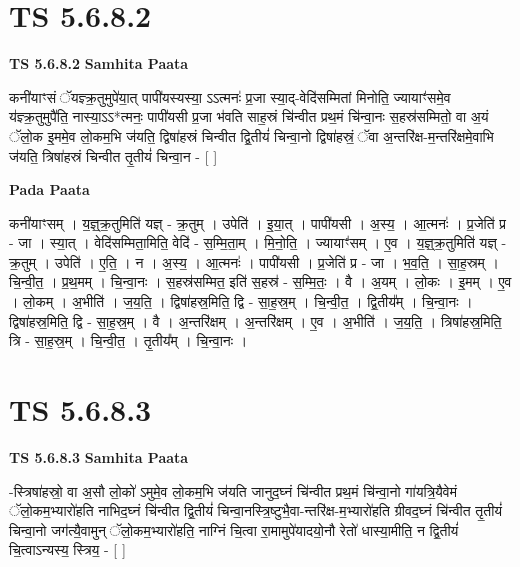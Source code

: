 \documentclass[17pt]{extarticle}
\begin{document}

\section{ TS 5.6.8.2 }

\textbf{TS 5.6.8.2 } \newline
\textbf{Samhita Paata} \newline

कनी॑याꣳसं ॅयज्ञ्क्र॒तुमुपे॑या॒त् पापी॑यस्यस्या॒ ऽऽत्मनः॑ प्र॒जा स्या॒द्-वेदि॑सम्मितां मिनोति॒ ज्यायाꣳ॑समे॒व य॑ज्ञ्क्र॒तुमुपै॑ति॒ नास्या॒ऽऽ*त्मनः॒ पापी॑यसी प्र॒जा भ॑वति साह॒स्रं चि॑न्वीत प्रथ॒मं चि॑न्वा॒नः स॒हस्र॑सम्मितो॒ वा अ॒यं ॅलो॒क इ॒ममे॒व लो॒कम॒भि ज॑यति॒ द्विषा॑हस्रं चिन्वीत द्वि॒तीयं॑ चिन्वा॒नो द्विषा॑हस्रं॒ ॅवा अ॒न्तरि॑क्ष-म॒न्तरि॑क्षमे॒वाभि ज॑यति॒ त्रिषा॑हस्रं चिन्वीत तृ॒तीयं॑ चिन्वा॒न - [  ] \newline

\textbf{Pada Paata} \newline

कनी॑याꣳसम् । य॒ज्ञ्॒क्र॒तुमिति॑ यज्ञ् - क्र॒तुम् । उपेति॑ । इ॒या॒त् । पापी॑यसी । अ॒स्य॒ । आ॒त्मनः॑ । प्र॒जेति॑ प्र - जा । स्या॒त् । वेदि॑सम्मिता॒मिति॒ वेदि॑ - स॒म्मि॒ता॒म् । मि॒नो॒ति॒ । ज्यायाꣳ॑सम् । ए॒व । य॒ज्ञ्॒क्र॒तुमिति॑ यज्ञ् - क्र॒तुम् । उपेति॑ । ए॒ति॒ । न । अ॒स्य॒ । आ॒त्मनः॑ । पापी॑यसी । प्र॒जेति॑ प्र - जा । भ॒व॒ति॒ । सा॒ह॒स्रम् । चि॒न्वी॒त॒ । प्र॒थ॒मम् । चि॒न्वा॒नः । स॒हस्र॑सम्मित॒ इति॑ स॒हस्र॑ - स॒म्मि॒तः॒ । वै । अ॒यम् । लो॒कः ।   इ॒मम् । ए॒व । लो॒कम् । अ॒भीति॑ । ज॒य॒ति॒ । द्विषा॑हस्र॒मिति॒ द्वि - सा॒ह॒स्र॒म् । चि॒न्वी॒त॒ । द्वि॒तीय᳚म् । चि॒न्वा॒नः । द्विषा॑हस्र॒मिति॒ द्वि - सा॒ह॒स्र॒म् । वै । अ॒न्तरि॑क्षम् । अ॒न्तरि॑क्षम् । ए॒व । अ॒भीति॑ । ज॒य॒ति॒ । त्रिषा॑हस्र॒मिति॒ त्रि - सा॒ह॒स्र॒म् । चि॒न्वी॒त॒ । तृ॒तीय᳚म् । चि॒न्वा॒नः ।  \newline





\section{ TS 5.6.8.3 }

\textbf{TS 5.6.8.3 } \newline
\textbf{Samhita Paata} \newline

-स्त्रिषा॑हस्रो॒ वा अ॒सौ लो॒को॑ ऽमुमे॒व लो॒कम॒भि ज॑यति जानुद॒घ्नं चि॑न्वीत प्रथ॒मं चि॑न्वा॒नो गा॑यत्रि॒यैवेमं ॅलो॒कम॒भ्यारो॑हति नाभिद॒घ्नं चि॑न्वीत द्वि॒तीयं॑ चिन्वा॒नस्त्रि॒ष्टुभै॒वा-न्तरि॑क्ष-म॒भ्यारो॑हति ग्रीवद॒घ्नं चि॑न्वीत तृ॒तीयं॑ चिन्वा॒नो जग॑त्यै॒वामुन् ॅलो॒कम॒भ्यारो॑हति॒ नाग्निं चि॒त्वा रा॒मामुपे॑यादयो॒नौ रेतो॑ धास्या॒मीति॒ न द्वि॒तीयं॑ चि॒त्वाऽन्यस्य॒ स्त्रिय॒ - [  ] \newline
\end{document}
